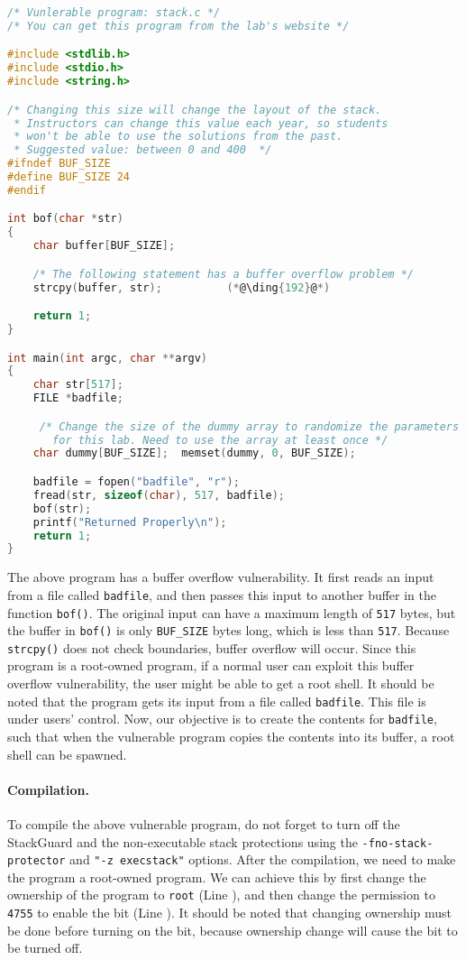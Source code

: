 \begin{lstlisting}[language=C]
/* Vunlerable program: stack.c */
/* You can get this program from the lab's website */

#include <stdlib.h>
#include <stdio.h>
#include <string.h>

/* Changing this size will change the layout of the stack.
 * Instructors can change this value each year, so students
 * won't be able to use the solutions from the past.
 * Suggested value: between 0 and 400  */
#ifndef BUF_SIZE
#define BUF_SIZE 24
#endif

int bof(char *str)
{
    char buffer[BUF_SIZE];

    /* The following statement has a buffer overflow problem */ 
    strcpy(buffer, str);          (*@\ding{192}@*)

    return 1;
}

int main(int argc, char **argv)
{
    char str[517];
    FILE *badfile;

     /* Change the size of the dummy array to randomize the parameters
       for this lab. Need to use the array at least once */
    char dummy[BUF_SIZE];  memset(dummy, 0, BUF_SIZE); 

    badfile = fopen("badfile", "r");
    fread(str, sizeof(char), 517, badfile);
    bof(str);
    printf("Returned Properly\n");
    return 1;
}
\end{lstlisting}

The above program has a buffer overflow vulnerability. It first 
reads an input from a file called \texttt{badfile}, and then passes this
input to another buffer in the function {\tt bof()}. The 
original input can have a maximum length of \texttt{517} bytes, but the buffer
in {\tt bof()} is only \texttt{BUF\_SIZE} bytes long, which is less than
\texttt{517}. 
Because {\tt strcpy()} does not check
boundaries, buffer overflow will occur.
Since this program is a root-owned \setuid program, if a normal user can exploit
this buffer overflow vulnerability, the user might be 
able to get a root shell.
It should be noted that 
the program gets its input from a file called \texttt{badfile}. This file
is under users' control. Now, our objective is to 
create the contents for \texttt{badfile}, such that when the vulnerable program
copies the contents into its buffer, a root shell can be spawned.


\paragraph{Compilation.}
To compile the above vulnerable program, do not forget to 
turn off the StackGuard and the non-executable stack protections 
using the \texttt{-fno-stack-protector} and \texttt{"-z execstack"} options.
After the compilation, we need to make the program a
root-owned \setuid program. We can achieve this by first change the ownership of the program to
\texttt{root} (Line ), and then change the permission to \texttt{4755} to enable the
\setuid bit (Line ). It should be noted that changing ownership must be done before
turning on the \setuid bit, because ownership change will cause the \setuid bit to be turned
off.


